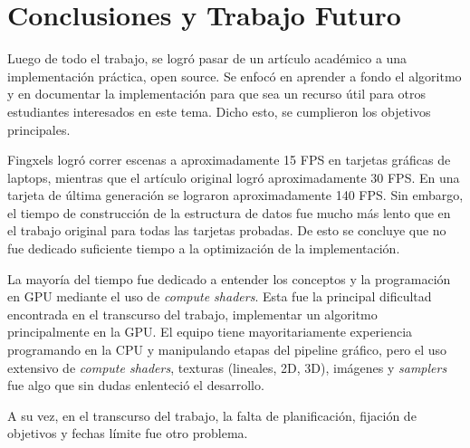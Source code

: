 \graphicspath{{chapters/6_conclusión/figures/}}

\chapter{Conclusiones y Trabajo Futuro}\label{chap:conclusions}

Luego de todo el trabajo, se logró pasar de un artículo académico a una implementación práctica, open source.
Se enfocó en aprender a fondo el algoritmo y en documentar la implementación para que sea un recurso útil para otros estudiantes interesados en este tema.
Dicho esto, se cumplieron los objetivos principales.

Fingxels logró correr escenas a aproximadamente 15 FPS en tarjetas gráficas de laptops, mientras que el artículo original logró aproximadamente 30 FPS.
En una tarjeta de última generación se lograron aproximadamente 140 FPS.
Sin embargo, el tiempo de construcción de la estructura de datos fue mucho más lento que en el trabajo original para todas las tarjetas probadas.
De esto se concluye que no fue dedicado suficiente tiempo a la optimización de la implementación.

La mayoría del tiempo fue dedicado a entender los conceptos y la programación en GPU mediante el uso de \textit{compute shaders}.
Esta fue la principal dificultad encontrada en el transcurso del trabajo, implementar un algoritmo principalmente en la GPU.
El equipo tiene mayoritariamente experiencia programando en la CPU y manipulando etapas del pipeline gráfico, pero el uso extensivo de \textit{compute shaders}, texturas (lineales, 2D, 3D), imágenes y \textit{samplers} fue algo que sin dudas enlenteció el desarrollo.

A su vez, en el transcurso del trabajo, la falta de planificación, fijación de objetivos y fechas límite fue otro problema.

